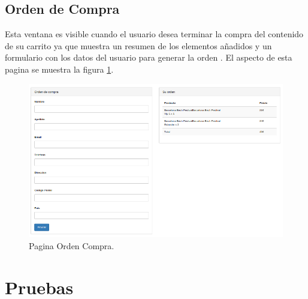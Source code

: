 \subsection*{Orden de Compra}
Esta ventana es visible cuando el usuario desea terminar la compra del contenido de su carrito  ya que muestra un resumen de los elementos añadidos y un formulario con los datos del usuario para generar la orden . El aspecto de esta pagina se muestra la figura  \ref{fig:Page_OrdenCompra}.
\begin{figure}[!h]
\begin{center}
   \includegraphics[width=0.5\linewidth]{Figures/CheckOut_CarShop}
  \decoRule
  \caption[ Orden Compra]{Pagina Orden Compra.}
\label{fig:Page_OrdenCompra}
\end{center}
\end{figure}
\section{Pruebas}